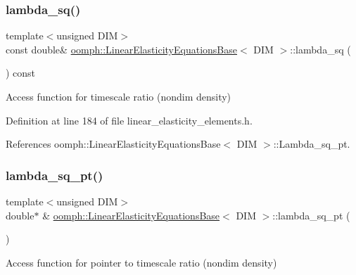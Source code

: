 \subsubsection{\texorpdfstring{lambda\+\_\+sq()}{lambda\_sq()}}
{\footnotesize\ttfamily template$<$unsigned D\+IM$>$ \\
const double\& \hyperlink{classoomph_1_1LinearElasticityEquationsBase}{oomph\+::\+Linear\+Elasticity\+Equations\+Base}$<$ D\+IM $>$\+::lambda\+\_\+sq (\begin{DoxyParamCaption}{ }\end{DoxyParamCaption}) const\hspace{0.3cm}{\ttfamily [inline]}}



Access function for timescale ratio (nondim density) 



Definition at line 184 of file linear\+\_\+elasticity\+\_\+elements.\+h.



References oomph\+::\+Linear\+Elasticity\+Equations\+Base$<$ D\+I\+M $>$\+::\+Lambda\+\_\+sq\+\_\+pt.

\mbox{\label{classoomph_1_1LinearElasticityEquationsBase_a0109438765421ac09ae6905ccc51642a}} 
\subsubsection{\texorpdfstring{lambda\+\_\+sq\+\_\+pt()}{lambda\_sq\_pt()}}
{\footnotesize\ttfamily template$<$unsigned D\+IM$>$ \\
double$\ast$ \& \hyperlink{classoomph_1_1LinearElasticityEquationsBase}{oomph\+::\+Linear\+Elasticity\+Equations\+Base}$<$ D\+IM $>$\+::lambda\+\_\+sq\+\_\+pt (\begin{DoxyParamCaption}{ }\end{DoxyParamCaption})\hspace{0.3cm}{\ttfamily [inline]}}



Access function for pointer to timescale ratio (nondim density) 



